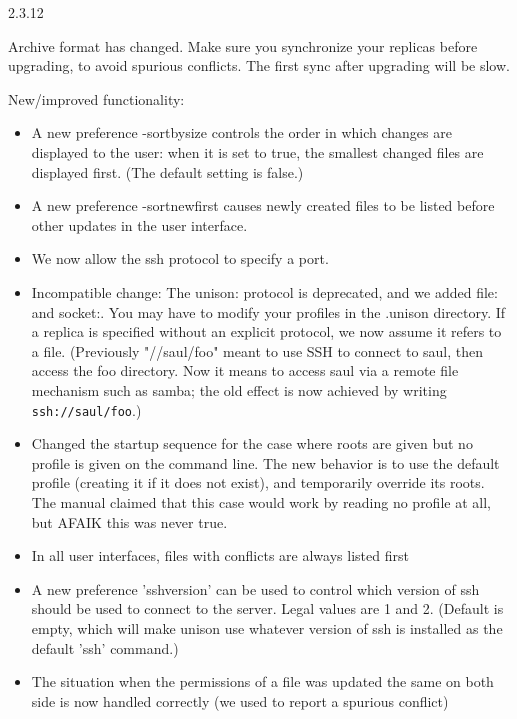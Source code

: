 \begin{changesfromversion}{2.3.12}
\item \incompatible{} Archive format has changed.  Make sure you
synchronize your replicas before upgrading, to avoid spurious
conflicts.  The first sync after upgrading will be slow.

\item New/improved functionality:
\begin{itemize}
\item  A new preference -sortbysize controls the order in which changes
  are displayed to the user: when it is set to true, the smallest
  changed files are displayed first.  (The default setting is false.) 
\item A new preference -sortnewfirst causes newly created files to be 
  listed before other updates in the user interface.
\item We now allow the ssh protocol to specify a port.  
\item Incompatible change: The unison: protocol is deprecated, and we added
  file: and socket:.  You may have to modify your profiles in the
  .unison directory.
  If a replica is specified without an explicit protocol, we now
  assume it refers to a file.  (Previously "//saul/foo" meant to use
  SSH to connect to saul, then access the foo directory.  Now it means
  to access saul via a remote file mechanism such as samba; the old
  effect is now achieved by writing {\tt ssh://saul/foo}.)
\item Changed the startup sequence for the case where roots are given but
  no profile is given on the command line.  The new behavior is to
  use the default profile (creating it if it does not exist), and
  temporarily override its roots.  The manual claimed that this case
  would work by reading no profile at all, but AFAIK this was never
  true.
\item In all user interfaces, files with conflicts are always listed first
\item A new preference 'sshversion' can be used to control which version
  of ssh should be used to connect to the server.  Legal values are 1 and 2.
  (Default is empty, which will make unison use whatever version of ssh
  is installed as the default 'ssh' command.)
\item The situation when the permissions of a file was updated the same on
  both side is now handled correctly (we used to report a spurious conflict)

\end{itemize}


\end{changesfromversion}

